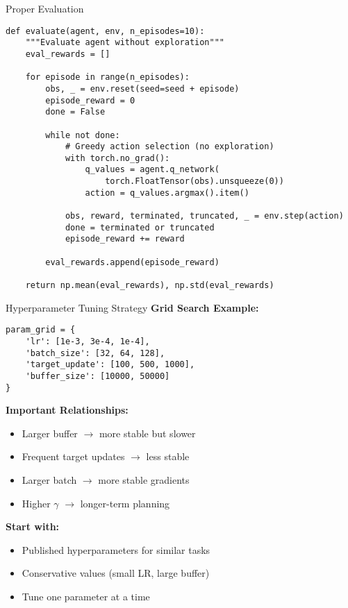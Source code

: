 \documentclass[aspectratio=169,10pt]{beamer}
\begin{document}
\begin{frame}[fragile]{Proper Evaluation}
\begin{lstlisting}
def evaluate(agent, env, n_episodes=10):
    """Evaluate agent without exploration"""
    eval_rewards = []
    
    for episode in range(n_episodes):
        obs, _ = env.reset(seed=seed + episode)
        episode_reward = 0
        done = False
        
        while not done:
            # Greedy action selection (no exploration)
            with torch.no_grad():
                q_values = agent.q_network(
                    torch.FloatTensor(obs).unsqueeze(0))
                action = q_values.argmax().item()
            
            obs, reward, terminated, truncated, _ = env.step(action)
            done = terminated or truncated
            episode_reward += reward
        
        eval_rewards.append(episode_reward)
    
    return np.mean(eval_rewards), np.std(eval_rewards)
\end{lstlisting}
\end{frame}

\begin{frame}[fragile]{Hyperparameter Tuning Strategy}
\textbf{Grid Search Example:}
\begin{lstlisting}
param_grid = {
    'lr': [1e-3, 3e-4, 1e-4],
    'batch_size': [32, 64, 128],
    'target_update': [100, 500, 1000],
    'buffer_size': [10000, 50000]
}
\end{lstlisting}

\textbf{Important Relationships:}
\begin{itemize}
    \item Larger buffer $\rightarrow$ more stable but slower
    \item Frequent target updates $\rightarrow$ less stable
    \item Larger batch $\rightarrow$ more stable gradients
    \item Higher $\gamma$ $\rightarrow$ longer-term planning
\end{itemize}

\textbf{Start with:}
\begin{itemize}
    \item Published hyperparameters for similar tasks
    \item Conservative values (small LR, large buffer)
    \item Tune one parameter at a time
\end{itemize}
\end{frame}
\end{document}
